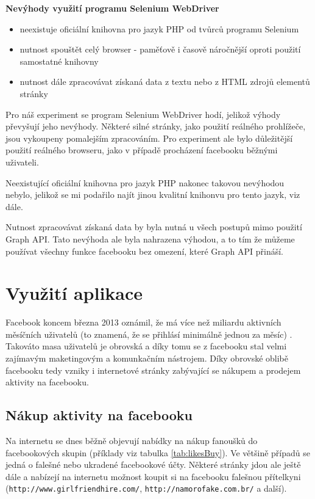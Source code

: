 \documentclass[thesis=M,czech]{FITthesis}[2013/05/10]
\begin{document}
\textbf{Nevýhody využití programu Selenium WebDriver}

\begin{itemize}
  \item neexistuje oficiální knihovna pro jazyk PHP 
  od tvůrců programu Selenium
  \item nutnost spouštět celý browser - paměťově i časově náročnější
  oproti použití samostatné knihovny
  \item nutnost dále zpracovávat získaná data z textu nebo z HTML zdrojů elementů stránky
\end{itemize}

Pro náš experiment se program Selenium WebDriver hodí, jelikož výhody převyšují jeho nevýhody. Některé silné stránky, jako použití reálného prohlížeče, jsou vykoupeny pomalejším zpracováním. Pro experiment ale bylo důležitější použití reálného browseru, jako v případě procházení facebooku běžnými uživateli.

Neexistující oficiální knihovna pro jazyk PHP nakonec takovou nevýhodou nebylo, jelikož se mi podařilo najít jinou kvalitní knihonvu pro tento jazyk, viz dále.

Nutnost zpracovávat získaná data by byla nutná u všech postupů mimo použití Graph API. Tato nevýhoda ale byla nahrazena výhodou, a to tím že můžeme používat všechny funkce facebooku bez omezení, které Graph API přináší.



\section{Využití aplikace}

Facebook koncem března 2013 oznámil, že má více než miliardu  aktivních měsíčních uživatelů (to znamená, že se přihlásí minimálně jednou za měsíc) \cite{web:fbMonthlyActiveUsers}. Takováto masa uživatelů je obrovská a díky tomu se z facebooku stal velmi zajímavým maketingovým a komunkačním nástrojem. Díky obrovské oblibě facebooku tedy vzniky i internetové stránky zabývající se nákupem a prodejem aktivity na facebooku.

\subsection{Nákup aktivity na facebooku}

Na internetu se dnes běžně objevují nabídky na nákup fanoušků do facebookových skupin (příklady viz tabulka \ref{tab:likesBuy}). Ve většině případů se jedná o falešné nebo ukradené facebookové účty. Některé stránky jdou ale ještě dále a nabízejí na internetu možnost koupit si na facebooku falešnou přítelkyni (\verb|http://www.girlfriendhire.com/|, \verb|http://namorofake.com.br/| a další). 
\end{document}

